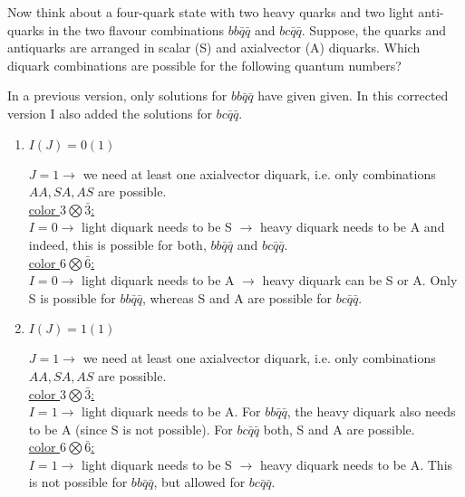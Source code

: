 

Now think about a four-quark state with two heavy quarks and two light anti-quarks in the two 
flavour combinations $bb\bar{q}\bar{q}$ and $bc\bar{q}\bar{q}$. Suppose, the quarks and antiquarks are 
arranged in scalar (S) and axialvector (A) diquarks. Which diquark combinations are possible for the following quantum numbers?

{\color{red} In a previous version, only solutions for $bb\bar{q}\bar{q}$ have given given. In this corrected version 
I also added the solutions for $bc\bar{q}\bar{q}$.}	

\begin{enumerate}
	\item $I(J) = 0(1)$
	      
	      \begin{solution}
		      $J=1 \rightarrow$ we need at least one axialvector diquark, i.e. only combinations $AA, SA, AS$ are possible.\\ 
		      \underline{color $3 \bigotimes \bar{3}$:}\\
		      $I=0 \rightarrow$ light diquark needs to be S $\rightarrow$ heavy diquark needs to be A and indeed, this is possible for
		      both, $bb\bar{q}\bar{q}$ and $bc\bar{q}\bar{q}$.\\
		      \underline{color $6 \bigotimes \bar{6}$:}\\
		      $I=0 \rightarrow$ light diquark needs to be A $\rightarrow$ heavy diquark can be S or A. Only S is possible for $bb\bar{q}\bar{q}$, whereas S and A are possible for $bc\bar{q}\bar{q}$. 	
	      \end{solution}
	      
	\item $I(J) = 1(1)$
	      
	      \begin{solution}
		      $J=1 \rightarrow$ we need at least one axialvector diquark, i.e. only combinations $AA, SA, AS$ are possible.\\ 
		      \underline{color $3 \bigotimes \bar{3}$:}\\
		      $I=1 \rightarrow$ light diquark needs to be A. For $bb\bar{q}\bar{q}$, the heavy diquark also needs to be A 
		      (since S is not possible). For $bc\bar{q}\bar{q}$ both,
		      S and A are possible.\\
		      \underline{color $6 \bigotimes \bar{6}$:}\\
		      $I=1 \rightarrow$ light diquark needs to be S $\rightarrow$ heavy diquark needs to be A. This is not possible for
		      $bb\bar{q}\bar{q}$, but allowed for $bc\bar{q}\bar{q}$.		
	      \end{solution}
	      

\end{enumerate}
